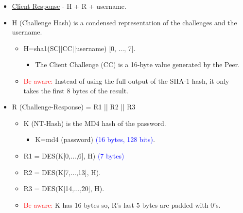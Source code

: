 \begin{tcolorbox}[colback=yellow!10!white, colframe=yellow!70!black, title=Peer \textrightarrow Authenticator] 
    
    \begin{itemize}
        \item \underline{Client Response} - H + R + username.
        \item H (Challenge Hash) is a condensed representation of the challenges and the username.
        \begin{itemize}
            \item H=sha1(SC||CC||username) [0, ..., 7].
        \begin{itemize}
            \item The Client Challenge (CC) is a 16-byte value generated by the Peer.
        \end{itemize}
        \item \textcolor{red}{Be aware: }Instead of using the full output of the SHA-1 hash, it only takes the first 8 bytes of the result. 
        \end{itemize}
        
        \item R (Challenge-Response) = R1 || R2 || R3
        \begin{itemize}
            \item K (NT-Hash) is the MD4 hash of the password.
        \begin{itemize}
            \item K=md4 (password) \textcolor{Blue}{(16 bytes, 128 bits)}.
        \end{itemize}
            \item R1 = DES(K[0,...,6], H) \textcolor{Blue}{(7 bytes)}
            \item R2 = DES(K[7,...,13], H).
            \item R3 = DES(K[14,...,20], H).
            \item \textcolor{red}{Be aware: } K has 16 bytes so, R's last 5 bytes are padded with 0's.
        \end{itemize}
    \end{itemize}
    
\end{tcolorbox}


